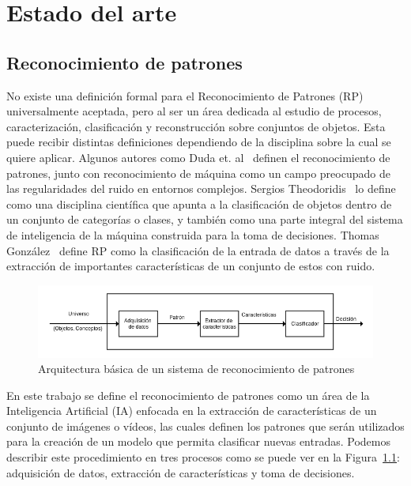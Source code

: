 \chapter[Estado del arte]{Estado del arte}
\label{ch:estado_del_arte}

\section{Reconocimiento de patrones}
\label{sec:rec_patrones}
	No existe una definición formal para el Reconocimiento de Patrones (RP) universalmente aceptada, pero al ser un área dedicada al estudio de procesos, caracterización, clasificación y reconstrucción sobre conjuntos de objetos. Esta puede recibir distintas definiciones dependiendo de la disciplina sobre la cual se quiere aplicar. Algunos autores como Duda et. al~\cite{dudaHart1973} definen el reconocimiento de patrones, junto con reconocimiento de máquina como un campo preocupado de las regularidades del ruido en entornos complejos. Sergios Theodoridis~\cite{Theodoridis} lo define como una disciplina científica que apunta a la clasificación de objetos dentro de un conjunto de categorías o clases, y también como una parte integral del sistema de inteligencia de la máquina construida para la toma de decisiones. Thomas González~\cite{thomas_gonzalez} define RP como la clasificación de la entrada de datos a través de la extracción de importantes características de un conjunto de estos con ruido. 

\begin{figure}[b]
  \centering
   \includegraphics[width=1\textwidth]{Figuras/Diagramas/estado_del_arte/Reconocimiento_de_patrones.png}
  \caption{Arquitectura básica de un sistema de reconocimiento de patrones}
  \label{art:fig:arquitectura}
\end{figure}


En este trabajo se define el reconocimiento de patrones como un área de la Inteligencia Artificial (IA) enfocada en la extracción de características de un conjunto de imágenes o vídeos, las cuales definen los patrones que serán utilizados para la creación de un modelo que permita clasificar nuevas entradas. Podemos describir este procedimiento en tres procesos como se puede ver en la Figura~\ref{art:fig:arquitectura}: adquisición de datos, extracción de características y toma de decisiones. 

